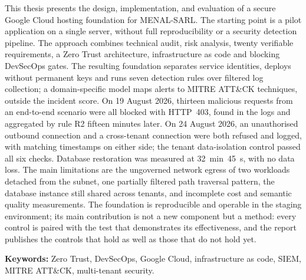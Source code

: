 
\vspace{10pt}
\noindent{}
\nopagebreak\par
\vspace{10pt}

{\footnotesize

This thesis presents the design, implementation, and evaluation of a secure Google Cloud hosting
foundation for MENAL-SARL. The starting point is a pilot application on a single server, without
full reproducibility or a security detection pipeline. The approach combines technical audit,
risk analysis, twenty verifiable requirements, a Zero Trust architecture, infrastructure as code
and blocking DevSecOps gates. The resulting foundation separates service identities, deploys
without permanent keys and runs seven detection rules over filtered log collection; a
domain-specific model maps alerts to MITRE ATT\&CK techniques, outside the incident score. On
19 August 2026, thirteen malicious requests from an end-to-end scenario were all blocked with
HTTP~403, found in the logs and aggregated by rule R2 fifteen minutes later. On 24 August 2026,
an unauthorised outbound connection and a cross-tenant connection were both refused and logged,
with matching timestamps on either side; the tenant data-isolation control passed all six
checks. Database restoration was measured at 32~min~45~s, with no data loss. The main
limitations are the ungoverned network egress of two workloads detached from the subnet, one
partially filtered path traversal pattern, the database instance still shared across tenants,
and incomplete cost and semantic quality measurements. The foundation is reproducible and
operable in the staging environment; its main contribution is not a new component but a method:
every control is paired with the test that demonstrates its effectiveness, and the report
publishes the controls that hold as well as those that do not hold yet.

\par\vspace{4pt}
\noindent\textbf{Keywords:} Zero Trust, DevSecOps, Google Cloud, infrastructure as code, SIEM,
MITRE ATT\&CK, multi-tenant security.

}

